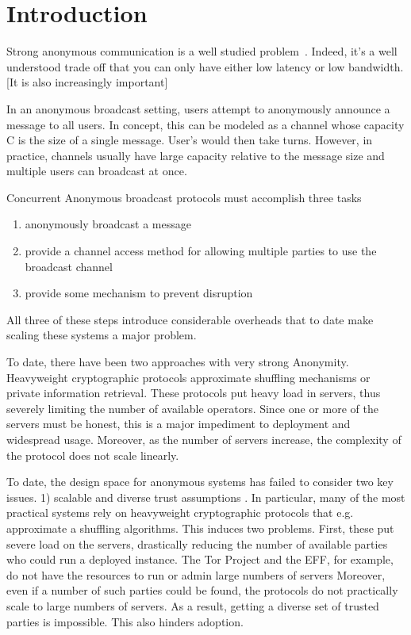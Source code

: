 
\section{Introduction}
Strong anonymous communication is a well studied problem~\cite{}. Indeed, it's a well understood trade off that you can only have either low latency or low bandwidth. [It is also increasingly important]


In an anonymous broadcast setting, users attempt to anonymously announce a message to all users. In concept, this can be modeled as a channel whose capacity C is the size of a single message. User's would then take turns. However, in practice, channels usually have large capacity relative to the message size and multiple users can broadcast at once. 

Concurrent Anonymous broadcast protocols must accomplish three tasks
\begin{enumerate}
	\item anonymously broadcast a message
	\item provide a channel access method for allowing multiple parties to use the broadcast channel
	\item provide some mechanism to prevent disruption
\end{enumerate}
All three of these steps introduce considerable overheads that to date make scaling these systems a major problem.


To date, there have been two approaches with very strong Anonymity. Heavyweight cryptographic protocols approximate shuffling mechanisms or private information retrieval.  These protocols put heavy load in servers, thus severely limiting the number of available operators.  Since one or more of the servers must be honest, this is a major impediment to deployment and widespread usage. 
Moreover, as the number of servers increase, the complexity of the protocol does not scale linearly.

To date, the design space for anonymous systems has failed to consider two key issues. 1) scalable and diverse trust assumptions . In particular, many of the most practical systems rely on heavyweight cryptographic protocols that e.g. approximate a shuffling algorithms. This induces two problems. First, these put severe load on the servers, drastically reducing the number of available parties who could run a deployed instance. The Tor Project and the EFF, for example, do not have the resources to run or admin large numbers of servers Moreover, even if a number of such parties could be found, the protocols do not practically scale to large numbers of servers. As a result, getting a diverse set of trusted parties is impossible.  This also hinders adoption.

